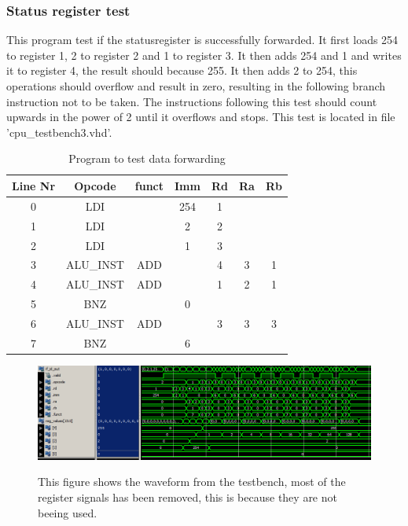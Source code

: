 \documentclass[11pt]{report}
\begin{document}
\subsubsection*{Status register test}

This program test if the statusregister is successfully forwarded.
It first loads 254 to register 1, 2 to register 2 and 1 to register 3.
It then adds 254 and 1 and writes it to register 4, the result should because
255. It then adds 2 to 254, this operations should overflow and result in zero,
resulting in the following branch instruction not to be taken. The instructions
following this test should count upwards in the power of 2 until it overflows
and stops. This test is located in file 'cpu\_testbench3.vhd'.

\begin{table}[h]
  \centering
  \begin{tabular}{|c|c|c|c|c|c|c|}
    \hline
    Line Nr &	Opcode		&	funct	&	Imm	&	Rd	&	Ra	&	Rb	\\\hline
    	0	&	LDI			&			&	254	&	1	&		&		\\\hline
    	1	&	LDI			&			&	2	&	2	&		&		\\\hline
    	2	&	LDI			&			&	1	&	3	&		&		\\\hline
    	3	&	ALU\_INST	&	ADD		&		&	4	&	3	&	1	\\\hline
    	4	&	ALU\_INST	&	ADD		&		&	1	&	2	&	1	\\\hline
    	5	&	BNZ			&			&	0	&		&		&		\\\hline
    	6	&	ALU\_INST	&	ADD		&		&	3	&	3	&	3	\\\hline
    	7	&	BNZ			&			&	6	&		&		&		\\\hline

		\end{tabular}
  \caption{Program to test data forwarding}
\end{table}

\begin{figure}
\centering
\includegraphics[width=.95\linewidth]{test3.png} \\
\caption{This figure shows the waveform from the testbench, 
most of the register signals has been removed, this is because they are not beeing used.}
\end{figure}
\end{document}
